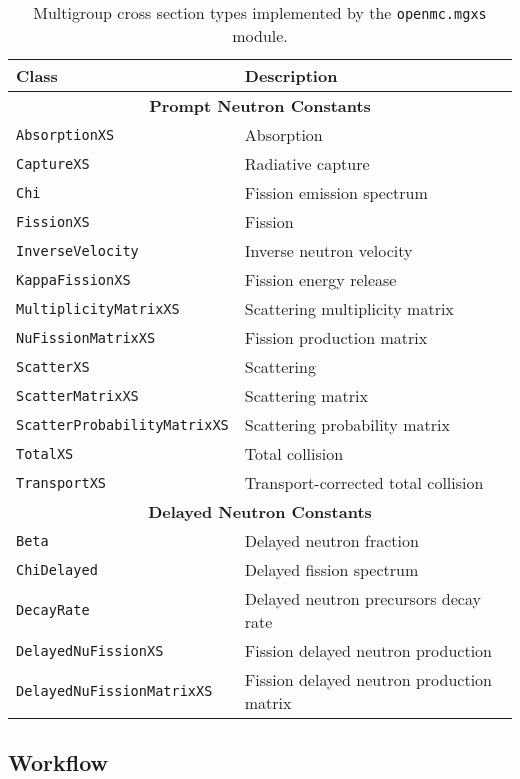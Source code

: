 \begin{table}[h!]
  \centering
  \caption{Multigroup cross section types implemented by the \texttt{openmc.mgxs} module.}
  \small
  \label{tab:mgxs-types}
  \vspace{6pt}
  \begin{tabular}{l l}
  \toprule
  \textbf{Class} &
  \textbf{Description} \\
  \midrule
  \multicolumn{2}{c}{\bf Prompt Neutron Constants} \\
  \midrule
  \texttt{AbsorptionXS} & Absorption \\
  \texttt{CaptureXS} & Radiative capture \\
  \texttt{Chi} & Fission emission spectrum \\
  \texttt{FissionXS} & Fission \\
  \texttt{InverseVelocity} & Inverse neutron velocity \\
  \texttt{KappaFissionXS} & Fission energy release \\
  \texttt{MultiplicityMatrixXS} & Scattering multiplicity matrix \\
  \texttt{NuFissionMatrixXS} & Fission production matrix \\
  \texttt{ScatterXS} & Scattering \\
  \texttt{ScatterMatrixXS} & Scattering matrix \\
  \texttt{ScatterProbabilityMatrixXS} & Scattering probability matrix \\
  \texttt{TotalXS} & Total collision \\
  \texttt{TransportXS} & Transport-corrected total collision \\
  \midrule
  \multicolumn{2}{c}{\bf Delayed Neutron Constants} \\
  \midrule
  \texttt{Beta} & Delayed neutron fraction \\
  \texttt{ChiDelayed} & Delayed fission spectrum \\
  \texttt{DecayRate} & Delayed neutron precursors decay rate \\
  \texttt{DelayedNuFissionXS} & Fission delayed neutron production \\
  \texttt{DelayedNuFissionMatrixXS} & Fission delayed neutron production matrix \\
  \bottomrule
\end{tabular}
\end{table}


\subsection{Workflow}
\label{subsec:workflow}

